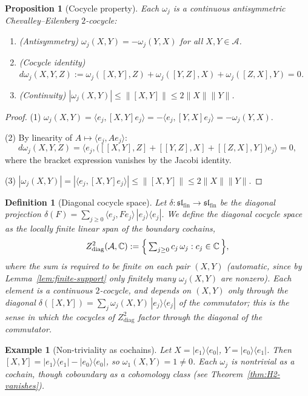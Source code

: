 \documentclass[10pt]{amsart}
\newcommand{\1}{{\mathbb{I}}}
\newtheorem{prop}[theorem]{Proposition}
\newtheorem{example}[theorem]{Example}
\newtheorem{definition}[theorem]{Definition}
\numberwithin{equation}{section}
\begin{document}
\begin{prop}[Cocycle property]\label{prop:2cocycle}
Each $\omega_j$ is a continuous antisymmetric Chevalley--Eilenberg $2$-cocycle:
\begin{enumerate}
\item \emph{(Antisymmetry)} $\omega_j(X,Y) = -\omega_j(Y,X)$ for all $X,Y\in\mathcal{A}$.
\item \emph{(Cocycle identity)} $d\omega_j(X,Y,Z) := \omega_j([X,Y],Z) + \omega_j([Y,Z],X) + \omega_j([Z,X],Y) = 0$.
\item \emph{(Continuity)} $|\omega_j(X,Y)| \le \|[X,Y]\| \le 2\|X\|\|Y\|$.
\end{enumerate}
\end{prop}
\begin{proof}
(1) $\omega_j(X,Y) = \langle e_j,[X,Y]e_j\rangle = -\langle e_j,[Y,X]e_j\rangle = -\omega_j(Y,X)$.

(2) By linearity of $A \mapsto \langle e_j, A e_j\rangle$:
\[
d\omega_j(X,Y,Z) = \langle e_j,\bigl([[X,Y],Z]+[[Y,Z],X]+[[Z,X],Y]\bigr)e_j\rangle = 0,
\]
where the bracket expression vanishes by the Jacobi identity.

(3) $|\omega_j(X,Y)| = |\langle e_j,[X,Y]e_j\rangle| \le \|[X,Y]\| \le 2\|X\|\|Y\|$.
\end{proof}

\begin{definition}[Diagonal cocycle space]\label{def:Z2diag}
Let $\delta:\mathfrak{sl}_{\mathrm{fin}}\to\mathfrak{sl}_{\mathrm{fin}}$ be the diagonal
projection $\delta(F)=\sum_{j\ge0}\langle e_j,Fe_j\rangle\,|e_j\rangle\langle e_j|$. We define the
\emph{diagonal cocycle space} as the locally finite linear span of the boundary cochains,
\[
Z^2_{\mathrm{diag}}(\mathcal{A},\mathbb{C})
:= \Bigl\{\, \textstyle\sum_{j\ge0} c_j\,\omega_j : c_j\in\mathbb{C} \,\Bigr\},
\]
where the sum is required to be finite on each pair $(X,Y)$ (automatic, since by
Lemma~\ref{lem:finite-support} only finitely many $\omega_j(X,Y)$ are nonzero). Each element is
a continuous $2$-cocycle, and depends on $(X,Y)$ only through the diagonal
$\delta([X,Y])=\sum_j\omega_j(X,Y)\,|e_j\rangle\langle e_j|$ of the commutator; this is the sense
in which the cocycles of $Z^2_{\mathrm{diag}}$ \emph{factor through the diagonal of the
commutator}.
\end{definition}

\begin{example}[Non-triviality as cochains]\label{ex:nontrivial}
Let $X = |e_1\rangle\langle e_0|$, $Y = |e_0\rangle\langle e_1|$. Then
$[X,Y] = |e_1\rangle\langle e_1| - |e_0\rangle\langle e_0|$, so $\omega_1(X,Y) = 1 \ne 0$.
Each $\omega_j$ is nontrivial as a cochain, though coboundary as a cohomology class
(see Theorem~\ref{thm:H2-vanishes}).
\end{example}
\end{document}
